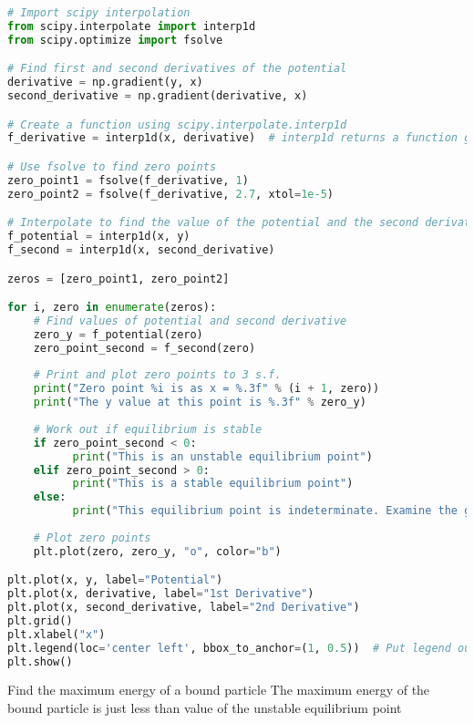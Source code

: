 \begin{lstlisting}[language=Python, frame=lines,basicstyle=\footnotesize, caption={Análise dos derivadas do potencial dados disponíveis no arquivo Potential.txt}, label={lst:Potential2}]
# Import scipy interpolation
from scipy.interpolate import interp1d
from scipy.optimize import fsolve

# Find first and second derivatives of the potential
derivative = np.gradient(y, x)
second_derivative = np.gradient(derivative, x)

# Create a function using scipy.interpolate.interp1d
f_derivative = interp1d(x, derivative)  # interp1d returns a function given a set of x and y points

# Use fsolve to find zero points
zero_point1 = fsolve(f_derivative, 1)
zero_point2 = fsolve(f_derivative, 2.7, xtol=1e-5)

# Interpolate to find the value of the potential and the second derivative at the turning points
f_potential = interp1d(x, y)
f_second = interp1d(x, second_derivative)

zeros = [zero_point1, zero_point2]

for i, zero in enumerate(zeros):
    # Find values of potential and second derivative
    zero_y = f_potential(zero)
    zero_point_second = f_second(zero)
    
    # Print and plot zero points to 3 s.f.
    print("Zero point %i is as x = %.3f" % (i + 1, zero))
    print("The y value at this point is %.3f" % zero_y)
          
    # Work out if equilibrium is stable
    if zero_point_second < 0:
          print("This is an unstable equilibrium point")
    elif zero_point_second > 0:
          print("This is a stable equilibrium point")
    else:
          print("This equilibrium point is indeterminate. Examine the graph or higher derivatives")
    
    # Plot zero points
    plt.plot(zero, zero_y, "o", color="b")

plt.plot(x, y, label="Potential")
plt.plot(x, derivative, label="1st Derivative")
plt.plot(x, second_derivative, label="2nd Derivative")
plt.grid()
plt.xlabel("x")
plt.legend(loc='center left', bbox_to_anchor=(1, 0.5))  # Put legend outside plot
plt.show()
\end{lstlisting}

Find the maximum energy of a bound particle
The maximum energy of the bound particle is just less than value of the unstable equilibrium point



